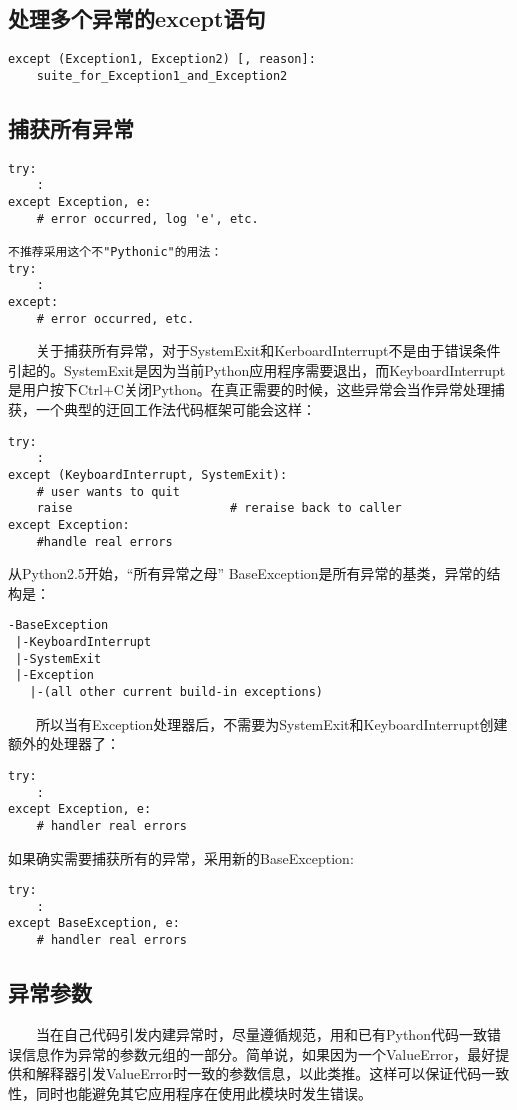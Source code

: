 \documentclass[11pt,a4paper]{article}
\begin{document}
\begin{CJK*}{UTF8}{nsung}
\subsection{处理多个异常的except语句}
\begin{verbatim}
except (Exception1, Exception2) [, reason]:
    suite_for_Exception1_and_Exception2
\end{verbatim}

\subsection{捕获所有异常}
\begin{verbatim}
try:
    :
except Exception, e:
    # error occurred, log 'e', etc.

不推荐采用这个不"Pythonic"的用法：
try:
    :
except:
    # error occurred, etc.
\end{verbatim}
~~~~关于捕获所有异常，对于SystemExit和KerboardInterrupt不是由于错误条件引起的。SystemExit是因为当前Python应用程序需要退出，而KeyboardInterrupt是用户按下Ctrl+C关闭Python。在真正需要的时候，这些异常会当作异常处理捕获，一个典型的迂回工作法代码框架可能会这样：
\begin{verbatim}
try:
    :
except (KeyboardInterrupt, SystemExit):
    # user wants to quit
    raise                      # reraise back to caller
except Exception:
    #handle real errors
\end{verbatim}

从Python2.5开始，“所有异常之母” BaseException是所有异常的基类，异常的结构是：
\begin{verbatim}
-BaseException
 |-KeyboardInterrupt
 |-SystemExit
 |-Exception
   |-(all other current build-in exceptions)
\end{verbatim}
~~~~所以当有Exception处理器后，不需要为SystemExit和KeyboardInterrupt创建额外的处理器了：
\begin{verbatim}
try:
    :
except Exception, e:
    # handler real errors
\end{verbatim}

如果确实需要捕获所有的异常，采用新的BaseException:
\begin{verbatim}
try:
    :
except BaseException, e:
    # handler real errors
\end{verbatim}

\subsection{异常参数}

~~~~当在自己代码引发内建异常时，尽量遵循规范，用和已有Python代码一致错误信息作为异常的参数元组的一部分。简单说，如果因为一个ValueError，最好提供和解释器引发ValueError时一致的参数信息，以此类推。这样可以保证代码一致性，同时也能避免其它应用程序在使用此模块时发生错误。\par



\end{CJK*}
\end{document}
